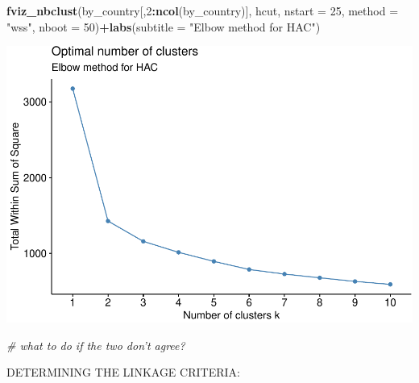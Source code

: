 \documentclass[]{article}
\newenvironment{Shaded}{\begin{snugshade}}{\end{snugshade}}
\newcommand{\CommentTok}[1]{\textcolor[rgb]{0.56,0.35,0.01}{\textit{#1}}}
\newcommand{\DataTypeTok}[1]{\textcolor[rgb]{0.13,0.29,0.53}{#1}}
\newcommand{\DecValTok}[1]{\textcolor[rgb]{0.00,0.00,0.81}{#1}}
\newcommand{\KeywordTok}[1]{\textcolor[rgb]{0.13,0.29,0.53}{\textbf{#1}}}
\newcommand{\NormalTok}[1]{#1}
\newcommand{\OperatorTok}[1]{\textcolor[rgb]{0.81,0.36,0.00}{\textbf{#1}}}
\newcommand{\StringTok}[1]{\textcolor[rgb]{0.31,0.60,0.02}{#1}}
\begin{document}
\begin{Shaded}
\begin{Highlighting}[]
\KeywordTok{fviz_nbclust}\NormalTok{(by_country[,}\DecValTok{2}\OperatorTok{:}\KeywordTok{ncol}\NormalTok{(by_country)], hcut, }\DataTypeTok{nstart =} \DecValTok{25}\NormalTok{,  }\DataTypeTok{method =} \StringTok{"wss"}\NormalTok{, }
             \DataTypeTok{nboot =} \DecValTok{50}\NormalTok{)}\OperatorTok{+}\KeywordTok{labs}\NormalTok{(}\DataTypeTok{subtitle =} \StringTok{"Elbow method for HAC"}\NormalTok{)}
\end{Highlighting}
\end{Shaded}

\includegraphics{eda_files/figure-latex/unnamed-chunk-14-4.pdf}

\begin{Shaded}
\begin{Highlighting}[]
\CommentTok{# what to do if the two don't agree?}
\end{Highlighting}
\end{Shaded}

DETERMINING THE LINKAGE CRITERIA:
\end{document}

